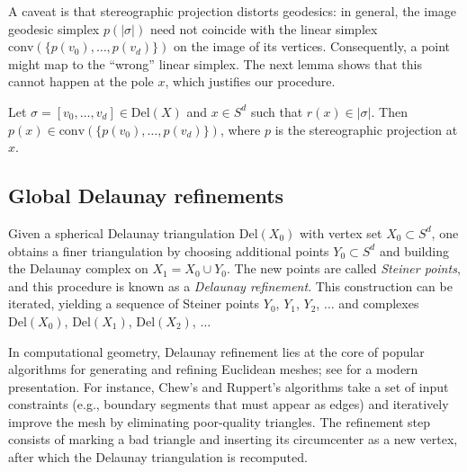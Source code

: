 \documentclass[a4paper,english,cleveref,autoref,thm-restate,nolineno]{socg-lipics-v2021}
\newcommand{\geomreal}[1] { |#1| } %
\newcommand{\Del}[1] { \mathrm{Del}(#1) } %
\newcommand{\conv}[1] { \mathrm{conv}(#1) } %
\newif\iffullversion
\newcommand{\fullonly}[1]{\iffullversion #1\fi}
\newcommand{\shortonly}[1]{\iffullversion\else #1\fi}
\begin{document}
A caveat is that stereographic projection distorts geodesics: in general, the image geodesic simplex $p(\geomreal{\sigma})$ need not coincide with the linear simplex $\conv{\{p(v_0),\dots,p(v_d)\}}$ on the image of its vertices. 
Consequently, a point might map to the ``wrong'' linear simplex.
The next lemma shows that this cannot happen at the pole $x$, which justifies our procedure.

\fullonly{
\begin{lemma}[%
	name={proof p.~\pageref{proof:originstereographicprojection}},%
	restate=originstereographicprojection%
	]
	\label{lem:originstereographicprojection}
	Let $\sigma=[v_0,\dots, v_d]\in\Del{X}$ and $x\in S^d$ such that $r(x)\in\geomreal{\sigma}$.
	Then $p(x)\in\conv{\{p(v_0),\dots,p(v_d)\}}$, where $p$ is the stereographic projection at $x$.
\end{lemma}
}

\shortonly{
\begin{lemma}
	\label{lem:originstereographicprojection}
	Let $\sigma=[v_0,\dots, v_d]\in\Del{X}$ and $x\in S^d$ such that $r(x)\in\geomreal{\sigma}$.
	Then $p(x)\in\conv{\{p(v_0),\dots,p(v_d)\}}$, where $p$ is the stereographic projection at $x$.
\end{lemma}
}

\subsection{Global Delaunay refinements}
\label{subsec:global_delaunay_refinements}

\fullonly{
\paragraph*{Definition and shrinking property}
}

Given a spherical Delaunay triangulation $\Del{X_0}$ with vertex set $X_0\subset S^d$, one obtains a finer triangulation by choosing additional points $Y_0\subset S^d$ and building the Delaunay complex on $X_1 = X_0 \cup Y_0$.
The new points are called \textit{Steiner points}, and this procedure is known as a \textit{Delaunay refinement}.
This construction can be iterated, yielding a sequence of Steiner points $Y_0$, $Y_1$, $Y_2$, $\dots$ and complexes $\Del{X_0}$, $\Del{X_1}$, $\Del{X_2}$, $\dots$

In computational geometry, Delaunay refinement lies at the core of popular algorithms for generating and refining Euclidean meshes; see \cite{cheng2013delaunay} for a modern presentation. 
For instance, Chew's and Ruppert's algorithms \cite{chew1989guaranteed,chew1993guaranteed,ruppert1995delaunay} take a set of input constraints (e.g., boundary segments that must appear as edges) and iteratively improve the mesh by eliminating poor-quality triangles. 
The refinement step consists of marking a bad triangle and inserting its circumcenter as a new vertex, after which the Delaunay triangulation is recomputed.
\end{document}
